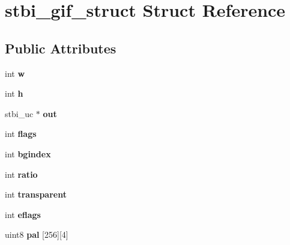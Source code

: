 \hypertarget{structstbi__gif__struct}{}\section{stbi\+\_\+gif\+\_\+struct Struct Reference}
\label{structstbi__gif__struct}
\subsection*{Public Attributes}
\begin{DoxyCompactItemize}
\item 
\mbox{\label{structstbi__gif__struct_a28e5c2fb704a64d23a7e8f9013ecda34}} 
int {\bfseries w}
\item 
\mbox{\label{structstbi__gif__struct_a6ce6b990464cdbbe9a408fe26581b296}} 
int {\bfseries h}
\item 
\mbox{\label{structstbi__gif__struct_a1c2d18ea92a86a416e7458cdaa9f4cc3}} 
stbi\+\_\+uc $\ast$ {\bfseries out}
\item 
\mbox{\label{structstbi__gif__struct_a3d22eaa3fe69a1d35ff914add9bb6df5}} 
int {\bfseries flags}
\item 
\mbox{\label{structstbi__gif__struct_a0d3690bdbbf0b772d5369c0a29b77cc1}} 
int {\bfseries bgindex}
\item 
\mbox{\label{structstbi__gif__struct_ac082648ce87130679bcde2dd4651c530}} 
int {\bfseries ratio}
\item 
\mbox{\label{structstbi__gif__struct_ab46e0fb6ad50c3caeac8800ef07b78a8}} 
int {\bfseries transparent}
\item 
\mbox{\label{structstbi__gif__struct_aad9790350cb2d775722dc5d55fdfde42}} 
int {\bfseries eflags}
\item 
\mbox{\label{structstbi__gif__struct_a3d96c452c7935b3a1ca49cc1ce410686}} 
uint8 {\bfseries pal} \mbox{[}256\mbox{]}\mbox{[}4\mbox{]}
\item 

\end{DoxyCompactItemize}

